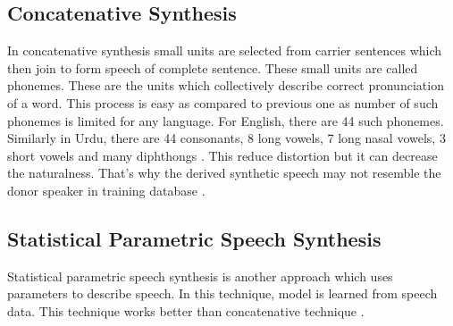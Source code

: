 \subsection{Concatenative Synthesis}
In concatenative synthesis small units are selected from carrier sentences which then join to form
speech of complete sentence. These small units are called phonemes. These are the units which
collectively describe correct pronunciation of a word. This process is easy as compared to previous one
as number of such phonemes is limited for any language. For English, there are 44 such phonemes.
Similarly in Urdu, there are 44 consonants, 8 long vowels, 7 long nasal vowels, 3 short vowels and many
diphthongs \cite{saleem2002urdu}. This reduce distortion but it can decrease the naturalness.
That’s why the derived synthetic speech may not resemble the donor speaker in training database \cite{huang1996whistler}.

\subsection{Statistical Parametric Speech Synthesis}
Statistical parametric speech synthesis is another approach which uses parameters to describe
speech. In this technique, model is learned from speech data. This technique works better than
concatenative technique \cite{merritt2013investigating}. 

